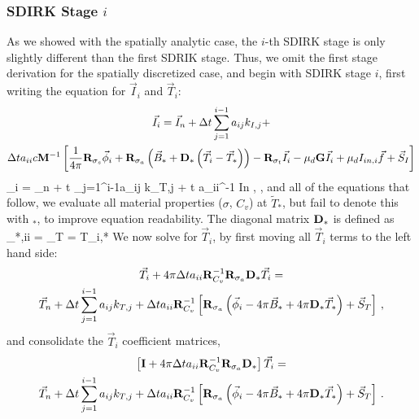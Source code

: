 \subsubsection{SDIRK Stage $i$}
As we showed with the spatially analytic case, the $i$-th SDIRK stage is only slightly different than the first SDRIK stage.
Thus, we omit the first stage derivation for the spatially discretized case, and begin with SDIRK stage $i$, first writing the equation for $\vec{I}_i$ and $\vec{T}_{i}$:
\begin{multline}
\vec{I}_i = \vec{I}_n + \Delta t \sum_{j=1}^{i-1}{a_{ij} k_{I,j}   } + \\
\Delta t a_{ii} c  \mathbf M^{-1}\left[ \frac{1}{4\pi}\mathbf{R}_{\sigma_s}\vec{\phi}_i +
\mathbf{R}_{\sigma_a}\left(\vec{B}_* +  \mathbf{D}_*  \left(\vec{T}_i -\vec{T}_*  \right)   \right)- \mathbf{R}_{\sigma_t} \vec{I}_i - \mu_d \mathbf{G}\vec{I}_i + \mu_d I_{in,i} \vec{f}+ \vec{S}_I
\right]
\label{eq:first_kIi}
\end{multline}
\benum
{}_i = _n + \Delta t \sum_{j=1}^{i-1}{a_{ij} k_{T,j}   } + \Delta t a_{ii}^{-1} \pep
\label{eq:first_kTi}
\eenum
In , , and all of the equations that follow, we evaluate all material properties ($\sigma$, $C_v$) at $\widetilde{T}_*$, but fail to denote this with $_*$, to improve equation readability. 
The diagonal matrix $ \mathbf{D}_* $ is defined as
\benum
{}_{*,ii} =  \bigg \lvert_{T = T_{i,*}} \pep
\eenum
%
%
We now solve  for $\vec{T}_{i}$, by first moving all $\vec{T}_i$ terms to the left hand side: 
%
%
\begin{multline}
\vec{T}_i +4\pi\Delta t a_{ii}\mathbf{R}_{C_v}^{-1}\mathbf{R}_{\sigma_a} \mathbf{D}_* \vec{T}_i = \\
\vec{T}_n + \Delta t \sum_{j=1}^{i-1}{a_{ij} k_{T,j}   } + \Delta t a_{ii}
\mathbf{R}_{C_v}^{-1}\left[
\mathbf{R}_{\sigma_a} \left(\vec{\phi}_i - 4\pi\vec{B}_* + 4\pi \mathbf{D}_* \vec{T}_* \right) + \vec{S}_T
 \right] \, ,
\end{multline}
%
%
and consolidate the $\vec{T}_i$ coefficient matrices,
\begin{multline}
\left[ \mathbf{I}  + 4\pi\Delta t a_{ii}\mathbf{R}_{C_v}^{-1}\mathbf{R}_{\sigma_a} \mathbf{D}_*   \right]\vec{T}_i = \\
\vec{T}_n + \Delta t \sum_{j=1}^{i-1}{a_{ij} k_{T,j}   } + \Delta t a_{ii}\mathbf{R}_{C_v}^{-1}\left[\mathbf{R}_{\sigma_a} \left(\vec{\phi}_i - 4\pi\vec{B}_* + 4\pi \mathbf{D}_* \vec{T}_* \right) + \vec{S}_T \right] \, .
\end{multline}
